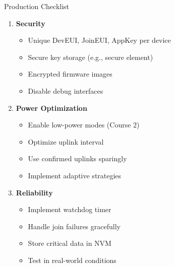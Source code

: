 \documentclass{beamer}
\begin{document}
\begin{frame}{Production Checklist}
\begin{enumerate}
    \item \textbf{Security}
    \begin{itemize}
        \item Unique DevEUI, JoinEUI, AppKey per device
        \item Secure key storage (e.g., secure element)
        \item Encrypted firmware images
        \item Disable debug interfaces
    \end{itemize}

    \item \textbf{Power Optimization}
    \begin{itemize}
        \item Enable low-power modes (Course 2)
        \item Optimize uplink interval
        \item Use confirmed uplinks sparingly
        \item Implement adaptive strategies
    \end{itemize}

    \item \textbf{Reliability}
    \begin{itemize}
        \item Implement watchdog timer
        \item Handle join failures gracefully
        \item Store critical data in NVM
        \item Test in real-world conditions
    \end{itemize}
\end{enumerate}
\end{frame}
\end{document}
